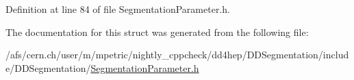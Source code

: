 Definition at line 84 of file SegmentationParameter.h.

The documentation for this struct was generated from the following file:\begin{DoxyCompactItemize}
\item 
/afs/cern.ch/user/m/mpetric/nightly\_\-cppcheck/dd4hep/DDSegmentation/include/DDSegmentation/\hyperlink{_segmentation_parameter_8h}{SegmentationParameter.h}\end{DoxyCompactItemize}

